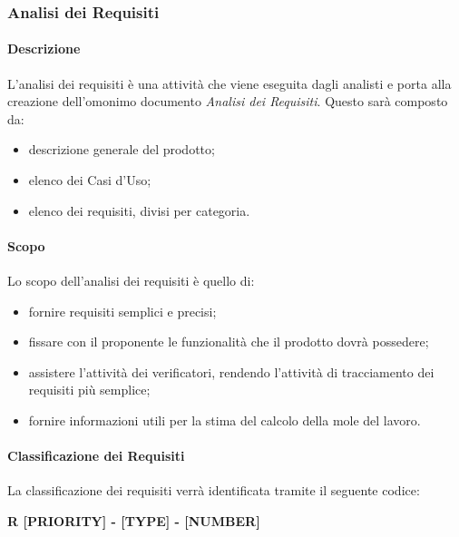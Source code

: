 \subsubsection{Analisi dei Requisiti}
\paragraph{Descrizione} \hfill \break
L'analisi dei requisiti è una attività che viene eseguita dagli analisti e porta alla creazione 
dell'omonimo documento \textit{Analisi dei Requisiti}.
Questo sarà composto da:
\begin{itemize}
  \item descrizione generale del prodotto;
  \item elenco dei Casi d'Uso;
  \item elenco dei requisiti, divisi per categoria.
\end{itemize}

\paragraph{Scopo} \hfill \break
Lo scopo dell'analisi dei requisiti è quello di:
\begin{itemize}
  \item fornire requisiti semplici e precisi;
  \item fissare con il proponente le funzionalità che il prodotto dovrà possedere;
  \item assistere l'attività dei verificatori, rendendo l'attività di tracciamento dei requisiti più semplice;
  \item fornire informazioni utili per la stima del calcolo della mole del lavoro.
\end{itemize}

\paragraph{Classificazione dei Requisiti} \hfill \break
La classificazione dei requisiti verrà identificata tramite il seguente codice: 
\begin{center}
  \textbf{R [PRIORITY] - [TYPE] - [NUMBER]}
\end{center}

